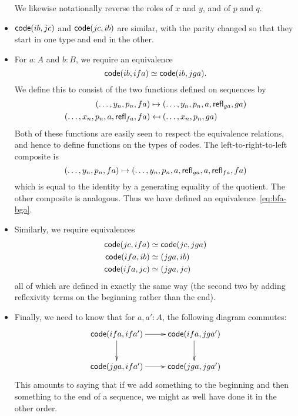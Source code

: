 \begin{itemize}
  We likewise notationally reverse the roles of $x$ and $y$, and of $p$ and $q$.
\item $\mathsf{code}(ib,jc)$ and $\mathsf{code}(jc,ib)$ are similar, with the parity changed so that they start in one type and end in the other.
\item For $a:A$ and $b:B$, we require an equivalence
  \begin{equation}
    \code(ib, ifa) \simeq \code(ib,jga).\label{eq:bfa-bga}
  \end{equation}
  We define this to consist of the two functions defined on sequences by
  \begin{align*}
    (\dots, y_n, p_n,fa) &\mapsto (\dots,y_n,p_n,a,\mathsf{refl}_{ga},ga)\\
    (\dots, x_n, p_n, a, \mathsf{refl}_{fa}, fa) &\mapsfrom (\dots, x_n, p_n, ga)
  \end{align*}
  Both of these functions are easily seen to respect the equivalence relations, and hence to define functions on the types of codes.
  The left-to-right-to-left composite is
  \[ (\dots, y_n, p_n,fa) \mapsto
  (\dots,y_n,p_n,a,\mathsf{refl}_{ga},a,\mathsf{refl}_{fa},fa)
  \]
  which is equal to the identity by a generating equality of the quotient.
  The other composite is analogous.
  Thus we have defined an equivalence~\eqref{eq:bfa-bga}.
\item Similarly, we require equivalences
  \begin{align*}
    \mathsf{code}(jc,ifa) &\simeq \mathsf{code}(jc,jga)\\
    \mathsf{code}(ifa,ib)&\simeq (jga,ib)\\
    \mathsf{code}(ifa,jc)&\simeq (jga,jc)
  \end{align*}
  all of which are defined in exactly the same way (the second two by adding reflexivity terms on the beginning rather than the end).
\item Finally, we need to know that for $a,a':A$, the following diagram commutes:
  \begin{equation}\label{eq:bfa-bga-comm}
  \vcenter{\xymatrix{
      \code(ifa,ifa') \ar[r]\ar[d] &
      \code(ifa,jga')\ar[d]\\
      \code(jga,ifa')\ar[r] &
      \code(jga,jga')
      }}
  \end{equation}
  This amounts to saying that if we add something to the beginning and then something to the end of a sequence, we might as well have done it in the other order.
\end{itemize}


